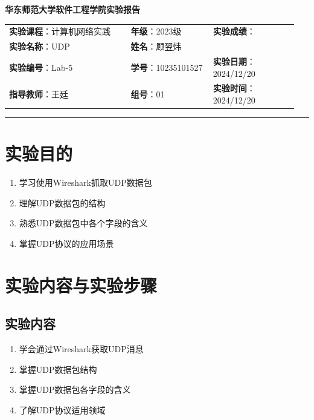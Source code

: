 \documentclass{article}
\begin{document}
	\begin{center}
		{\Large{\textbf{\heiti 华东师范大学软件工程学院实验报告}}}
		\begin{table}[htb]
			\flushleft
			\begin{tabular}{p{0.4\linewidth}p{0.27\linewidth}p{0.28\linewidth}}\\
				\textbf{实验课程}：计算机网络实践  & \textbf{年级}：2023级       & \textbf{实验成绩}：  \\
				\textbf{实验名称}：UDP & \textbf{姓名}：顾翌炜         &                 \\
				\textbf{实验编号}：Lab-5     & \textbf{学号}：10235101527 & \textbf{实验日期}：2024/12/20  \\
				\textbf{指导教师}：王廷     & \textbf{组号}：01            & \textbf{实验时间}：2024/12/20  \\ 
			\end{tabular}
		\end{table}
	\end{center}
	\rule{\textwidth}{2pt}
	
	\section{实验目的}
	
	\begin{enumerate}[noitemsep, label={{\arabic*})}]
		\item 学习使用Wireshark抓取UDP数据包
		\item 理解UDP数据包的结构
		\item 熟悉UDP数据包中各个字段的含义
		\item 掌握UDP协议的应用场景
	\end{enumerate}
	
	\section{实验内容与实验步骤}
	
	\subsection{实验内容}
	
	\begin{enumerate}[noitemsep, label={{\arabic*})}]
		\item 学会通过Wireshark获取UDP消息
		\item 掌握UDP数据包结构
		\item 掌握UDP数据包各字段的含义
		\item 了解UDP协议适用领域
	\end{enumerate}\textbf{}
	
\end{document}
